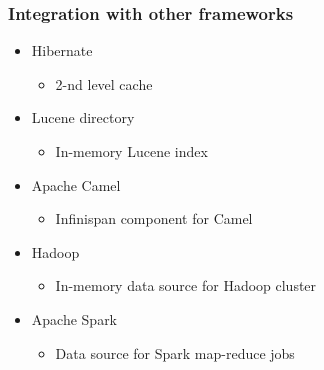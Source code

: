 \documentclass[10pt,utf8]{beamer}
\begin{document}
\begin{frame}
	\frametitle{Integration with other frameworks}
	\begin{itemize}
		\item Hibernate
		\begin{itemize}
			\item 2-nd level cache
		\end{itemize}
		\item Lucene directory
		\begin{itemize}
		 \item In-memory Lucene index 
		\end{itemize}
		\item Apache Camel
		\begin{itemize}
		 \item Infinispan component for Camel
		\end{itemize}
		\item Hadoop
		\begin{itemize}
			\item In-memory data source for Hadoop cluster
		\end{itemize}
		\item Apache Spark
		\begin{itemize}
			\item Data source for Spark map-reduce jobs
		\end{itemize}
	\end{itemize}
\end{frame}
\end{document}
